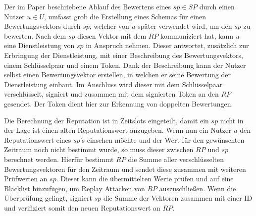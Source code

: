 \documentclass[
	fontsize=11pt,
	headings=small,
	parskip=half,           %
	bibliography=totoc,
	numbers=noenddot,       %
	open=any,               %
]{scrreprt}
\begin{document}
Der im Paper beschriebene Ablauf des Bewertens eines $sp \in SP$ durch einen Nutzer $u \in U$, umfasst grob die Erstellung eines Schemas für einen Bewertungsvektors durch $sp$, welcher von $u$ später verwendet wird, um den $sp$ zu bewerten. Nach dem $sp$ diesen Vektor mit dem $RP$ kommuniziert hat, kann $u$ eine Dienstleistung von $sp$ in Anspruch nehmen. Dieser antwortet, zusätzlich zur Erbringung der Dienstleistung, mit einer Beschreibung des Bewertungsvektors, einem Schlüsselpaar und einem Token. Dank der Beschreibung kann der Nutzer selbst einen Bewertungsvektor erstellen, in welchen er seine Bewertung der Dienstleistung einbaut. Im Anschluss wird dieser mit dem Schlüsselpaar verschlüsselt, signiert und zusammen mit dem signierten Token an den $RP$ gesendet. Der Token dient hier zur Erkennung von doppelten Bewertungen. 

Die Berechnung der Reputation ist in Zeitslots eingeteilt, damit ein $sp$ nicht in der Lage ist einen alten Reputationswert anzugeben. Wenn nun ein Nutzer $u$ den Reputationswert eines $sp$'s einsehen möchte und der Wert für den gewünschten Zeitraum noch nicht bestimmt wurde, so muss dieser zwischen $RP$ und $sp$ berechnet werden. Hierfür bestimmt $RP$ die Summe aller verschlüsselten Bewertungsvektoren für den Zeitraum und sendet diese zusammen mit weiteren Prüfwerten an $sp$. Dieser kann die übermittelten Werte prüfen und auf eine Blacklist hinzufügen, um Replay Attacken von $RP$ auszuschließen. Wenn die Überprüfung gelingt, signiert $sp$ die Summe der Vektoren zusammen mit einer ID und verifiziert somit den neuen Reputationswert an $RP$. 
\end{document}
